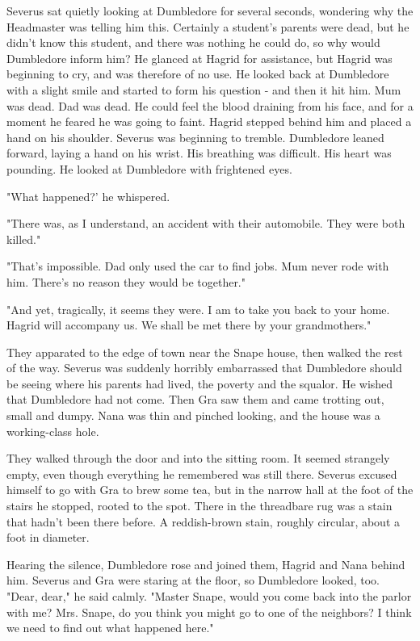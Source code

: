 \documentclass[a4paper,11pt]{article}
\begin{document}
Severus sat quietly looking at Dumbledore for several seconds, wondering why the Headmaster was telling him this. Certainly a student's parents were dead, but he didn't know this student, and there was nothing he could do, so why would Dumbledore inform him? He glanced at Hagrid for assistance, but Hagrid was beginning to cry, and was therefore of no use. He looked back at Dumbledore with a slight smile and started to form his question - and then it hit him. Mum was dead. Dad was dead. He could feel the blood draining from his face, and for a moment he feared he was going to faint. Hagrid stepped behind him and placed a hand on his shoulder. Severus was beginning to tremble. Dumbledore leaned forward, laying a hand on his wrist. His breathing was difficult. His heart was pounding. He looked at Dumbledore with frightened eyes.

"What happened?' he whispered.

"There was, as I understand, an accident with their automobile. They were both killed."

"That's impossible. Dad only used the car to find jobs. Mum never rode with him. There's no reason they would be together."

"And yet, tragically, it seems they were. I am to take you back to your home. Hagrid will accompany us. We shall be met there by your grandmothers."

They apparated to the edge of town near the Snape house, then walked the rest of the way. Severus was suddenly horribly embarrassed that Dumbledore should be seeing where his parents had lived, the poverty and the squalor. He wished that Dumbledore had not come. Then Gra saw them and came trotting out, small and dumpy. Nana was thin and pinched looking, and the house was a working-class hole.

They walked through the door and into the sitting room. It seemed strangely empty, even though everything he remembered was still there. Severus excused himself to go with Gra to brew some tea, but in the narrow hall at the foot of the stairs he stopped, rooted to the spot. There in the threadbare rug was a stain that hadn't been there before. A reddish-brown stain, roughly circular, about a foot in diameter.

Hearing the silence, Dumbledore rose and joined them, Hagrid and Nana behind him. Severus and Gra were staring at the floor, so Dumbledore looked, too. "Dear, dear," he said calmly. "Master Snape, would you come back into the parlor with me? Mrs. Snape, do you think you might go to one of the neighbors? I think we need to find out what happened here."
\end{document}
